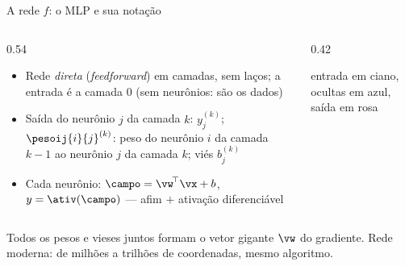 \documentclass[aspectratio=169, 11pt]{beamer}
\begin{document}
\begin{frame}{A rede $f$: o MLP e sua notação}
  \begin{columns}[T]
    \begin{column}{0.54\textwidth}
      \begin{itemize}\setlength{\itemsep}{0.3ex}
        \item Rede \emph{direta} (\emph{feedforward}) em camadas, sem laços;
              a entrada é a camada $0$ (sem neurônios: são os dados)
        \item Saída do neurônio $j$ da camada $k$: $y_j^{(k)}$;\;
              $\pesoij{i}{j}^{(k)}$: peso do neurônio $i$ da camada $k{-}1$ ao
              neurônio $j$ da camada $k$; viés $b_j^{(k)}$
        \item Cada neurônio: $\campo = \vw^{\!\top}\vx + b$,\; $y = \ativ(\campo)$
              — afim $+$ ativação \alert{diferenciável}
      \end{itemize}
    \end{column}
    \begin{column}{0.42\textwidth}
      \begin{center}

        {\color{icCinza}\scriptsize entrada em ciano, ocultas em azul, saída em rosa}
      \end{center}
    \end{column}
  \end{columns}

  \begin{ideiabox}
    Todos os pesos e vieses juntos formam o vetor gigante $\vw$ do gradiente.
    Rede moderna: de milhões a trilhões de coordenadas, mesmo algoritmo.
  \end{ideiabox}
\end{frame}
\end{document}
